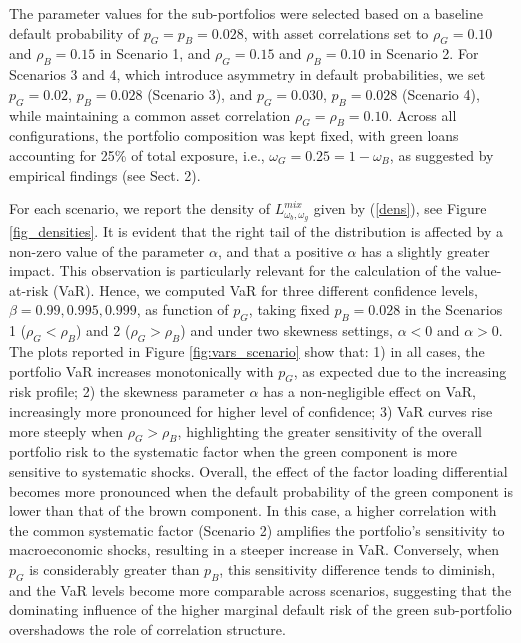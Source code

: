 \documentclass[preprint,12pt]{article}
\begin{document}
The parameter values for the sub-portfolios were selected based on a baseline default probability of $p_G = p_B = 0.028$, with asset correlations set to $\rho_G = 0.10$ and $\rho_B = 0.15$ in Scenario 1, and $\rho_G = 0.15$ and $\rho_B = 0.10$ in Scenario 2. For Scenarios 3 and 4, which introduce asymmetry in default probabilities, we set $p_G = 0.02$, $p_B = 0.028$ (Scenario 3), and $p_G = 0.030$, $p_B = 0.028$ (Scenario 4), while maintaining a common asset correlation $\rho_G = \rho_B = 0.10$. Across all configurations, the portfolio composition was kept fixed, with green loans accounting for 25\% of total exposure, i.e., $\omega_G = 0.25 = 1 - \omega_B$, as suggested by empirical findings (see Sect. 2).

For each scenario, we report the density of $L^{mix}_{\omega_b,\omega_g}$ given by  (\ref{dens}), see Figure \ref{fig_densities}. It is evident that the right tail of the distribution is affected by a non-zero value of the parameter $\alpha$, and that a positive $\alpha$ has a slightly greater impact. This observation is particularly relevant for the calculation of the value-at-risk (VaR). Hence, we computed VaR for three different confidence levels, $\beta = 0.99, 0.995, 0.999$, as function of $p_G$, taking fixed $p_B=0.028$ in the Scenarios 1 ($\rho_G < \rho_B$) and 2 ($\rho_G > \rho_B$) and under two skewness settings, $\alpha<0$ and $\alpha>0$. The plots reported in Figure \ref{fig:vars_scenario} show that: 1) in all cases, the portfolio VaR increases monotonically with $p_G$, as expected due to the increasing risk profile; 2) the skewness parameter $\alpha$ has a non-negligible effect on VaR, increasingly more pronounced for higher level of confidence; 3) VaR curves rise more steeply when $\rho_G > \rho_B$, highlighting the greater sensitivity of the overall portfolio risk to the systematic factor when the green component is more sensitive to systematic shocks.  Overall, the effect of the factor loading differential becomes more pronounced when the default probability of the green component is lower than that of the brown component. In this case, a higher correlation with the common systematic factor (Scenario 2) amplifies the portfolio's sensitivity to macroeconomic shocks, resulting in a steeper increase in VaR. Conversely, when $p_G$ is considerably greater than $p_B$, this sensitivity difference tends to diminish, and the VaR levels become more comparable across scenarios, suggesting that the dominating influence of the higher marginal default risk of the green sub-portfolio overshadows the role of correlation structure.
\end{document}
